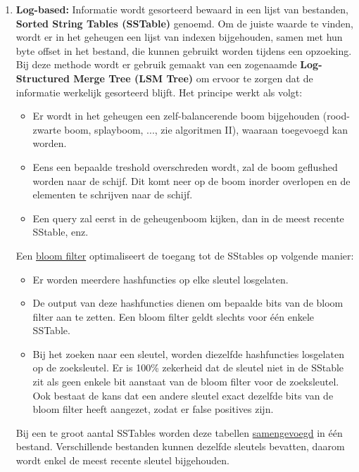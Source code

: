 \begin{enumerate}
		\item  \textbf{Log-based:} Informatie wordt gesorteerd bewaard in een lijst van bestanden, \textbf{Sorted String Tables (SSTable)} genoemd. Om de juiste waarde te vinden, wordt er in het geheugen een lijst van indexen bijgehouden, samen met hun byte offset in het bestand, die kunnen gebruikt worden tijdens een opzoeking. Bij deze methode wordt er gebruik gemaakt van een zogenaamde \textbf{Log-Structured Merge Tree (LSM Tree)} om ervoor te zorgen dat de informatie werkelijk gesorteerd blijft. Het principe werkt als volgt:
		\begin{itemize}
			\item  Er wordt in het geheugen een zelf-balancerende boom bijgehouden (rood-zwarte boom, splayboom, ..., zie algoritmen II), waaraan toegevoegd kan worden.
			\item  Eens een bepaalde treshold overschreden wordt, zal de boom geflushed worden naar de schijf. Dit komt neer op de boom inorder overlopen en de elementen te schrijven naar de schijf. 
			\item  Een query zal eerst in de geheugenboom kijken, dan in de meest recente SStable, enz. 
		\end{itemize}
        Een \underline{bloom filter} optimaliseert de toegang tot de SStables op volgende manier:
        \begin{itemize}
            \item  Er worden meerdere hashfuncties op elke sleutel losgelaten. 
            \item  De output van deze hashfuncties dienen om bepaalde bits van de bloom filter aan te zetten. Een bloom filter geldt slechts voor één enkele SSTable.
            \item  Bij het zoeken naar een sleutel, worden diezelfde hashfuncties losgelaten op de zoeksleutel. Er is 100\% zekerheid dat de sleutel niet in de SStable zit als geen enkele bit aanstaat van de bloom filter voor de zoeksleutel. Ook bestaat de kans dat een andere sleutel exact dezelfde bits van de bloom filter heeft aangezet, zodat er false positives zijn. 
        \end{itemize}
        Bij een te groot aantal SSTables worden deze tabellen \underline{samengevoegd} in één bestand. Verschillende bestanden kunnen dezelfde sleutels bevatten, daarom wordt enkel de meest recente sleutel bijgehouden.


\end{enumerate}
